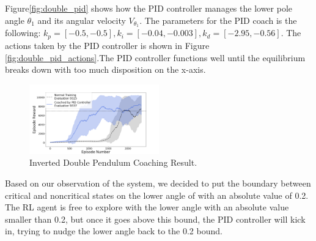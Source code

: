 \documentclass{IJCAS}
\begin{document}
Figure\ref{fig:double_pid} shows how the PID controller manages the lower pole angle $\theta_1$ and its angular velocity $V_{\theta_1}$. The parameters for the PID coach is the following: $k_p=[-0.5,-0.5], k_i=[-0.04,-0.003], k_d=[-2.95,-0.56]$. The actions taken by the PID controller is shown in Figure \ref{fig:double_pid_actions}.The PID controller functions well until the equilibrium breaks down with too much disposition on the x-axis.

\begin{figure}[H]
\centering
\includegraphics[width=0.5\textwidth]{double.png}
\caption{Inverted Double Pendulum Coaching Result.}
\label{fig:double_result}
\end{figure}

Based on our observation of the system, we decided to put the boundary between critical and noncritical states on the lower angle of with an absolute value of 0.2. The RL agent is free to explore with the lower angle with an absolute value smaller than 0.2, but once it goes above this bound, the PID controller will kick in, trying to nudge the lower angle back to the 0.2 bound.
\end{document}
